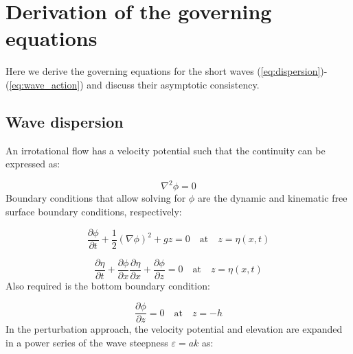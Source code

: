 \documentclass[lineno]{jfm}
\begin{document}


\appendix

\section{Derivation of the governing equations}
\label{appendix:derivation}

Here we derive the governing equations for the short waves
(\ref{eq:dispersion})-(\ref{eq:wave_action}) and discuss their asymptotic
consistency.

\subsection{Wave dispersion}

An irrotational flow has a velocity potential such that the continuity can be
expressed as:

\begin{equation}
  \nabla^2 \phi = 0
  \label{eq:laplace_equation}
\end{equation}
Boundary conditions that allow solving for $\phi$ are the dynamic and kinematic
free surface boundary conditions, respectively:

\begin{equation}
  \frac{\partial \phi}{\partial t} + \frac{1}{2} (\nabla{\phi})^2 + gz = 0 \quad \text{at} \quad z = \eta(x,t)
  \label{eq:dynamic_free_surface_boundary_condition}
\end{equation}

\begin{equation}
  \frac{\partial \eta}{\partial t} + \frac{\partial \phi}{\partial x} \frac{\partial \eta}{\partial x} + \frac{\partial \phi}{\partial z} = 0 \quad \text{at} \quad z = \eta(x,t)
  \label{eq:kinematic_free_surface_boundary_condition}
\end{equation}
Also required is the bottom boundary condition:

\begin{equation}
  \frac{\partial \phi}{\partial z} = 0 \quad \text{at} \quad z = -h
\end{equation}
In the \citet{stokes1847} perturbation approach, the velocity potential and
elevation are expanded in a power series of the wave steepness
$\varepsilon = ak$ as:
\end{document}
